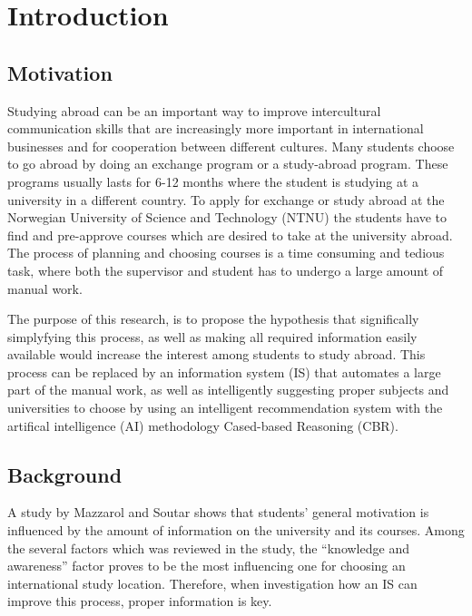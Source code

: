 
\chapter{Introduction}

\section{Motivation}

Studying abroad can be an important way to improve intercultural communication skills that are increasingly more important in international businesses and for cooperation between different cultures.\cite{williams2005exploring} Many students choose to go abroad by doing an exchange program or a study-abroad program. These programs usually lasts for 6-12 months where the student is studying at a university in a different country. To apply for exchange or study abroad at the Norwegian University of Science and Technology (NTNU) the students have to find and pre-approve courses which are desired to take at the university abroad. The process of planning and choosing courses is a time consuming and tedious task, where both the supervisor and student has to undergo a large amount of manual work. 

The purpose of this research, is to propose the hypothesis that significally simplyfying this process, as well as making all required information easily available would increase the interest among students to study abroad. This process can be replaced by an information system (IS) that automates a large part of the manual work, as well as intelligently suggesting proper subjects and universities to choose by using an intelligent recommendation system with the artifical intelligence (AI) methodology Cased-based Reasoning (CBR).


\section{Background}

A study by Mazzarol and Soutar\cite{mazzarol2002push} shows that students' general motivation is influenced by the amount of information on the university and its courses. Among the several factors which was reviewed in the study, the \enquote{knowledge and awareness} factor proves to be the most influencing one for choosing an international study location. Therefore, when investigation how an IS can improve this process, proper information is key. 

